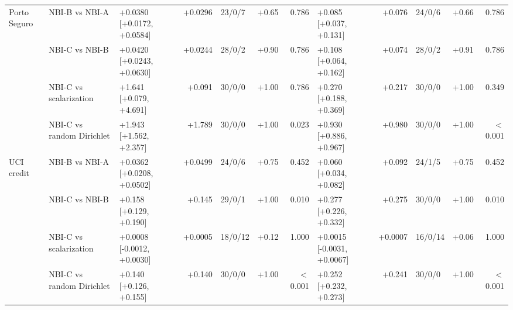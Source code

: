 \begin{table}[t]
{\begin{tabular}{ll lrlrr lrlrr}
\addlinespace
Porto Seguro & NBI-B vs NBI-A & +0.0380 [+0.0172, +0.0584] & +0.0296 & 23/0/7 & +0.65 & 0.786 & +0.085 [+0.037, +0.131] & +0.076 & 24/0/6 & +0.66 & 0.786 \\
 & NBI-C vs NBI-B & +0.0420 [+0.0243, +0.0630] & +0.0244 & 28/0/2 & +0.90 & 0.786 & +0.108 [+0.064, +0.162] & +0.074 & 28/0/2 & +0.91 & 0.786 \\
 & NBI-C vs scalarization & +1.641 [+0.079, +4.691] & +0.091 & 30/0/0 & +1.00 & 0.786 & +0.270 [+0.188, +0.369] & +0.217 & 30/0/0 & +1.00 & 0.349 \\
 & NBI-C vs random Dirichlet & +1.943 [+1.562, +2.357] & +1.789 & 30/0/0 & +1.00 & 0.023 & +0.930 [+0.886, +0.967] & +0.980 & 30/0/0 & +1.00 & $<$0.001 \\
\addlinespace
UCI credit & NBI-B vs NBI-A & +0.0362 [+0.0208, +0.0502] & +0.0499 & 24/0/6 & +0.75 & 0.452 & +0.060 [+0.034, +0.082] & +0.092 & 24/1/5 & +0.75 & 0.452 \\
 & NBI-C vs NBI-B & +0.158 [+0.129, +0.190] & +0.145 & 29/0/1 & +1.00 & 0.010 & +0.277 [+0.226, +0.332] & +0.275 & 30/0/0 & +1.00 & 0.010 \\
 & NBI-C vs scalarization & +0.0008 [-0.0012, +0.0030] & +0.0005 & 18/0/12 & +0.12 & 1.000 & +0.0015 [-0.0031, +0.0067] & +0.0007 & 16/0/14 & +0.06 & 1.000 \\
 & NBI-C vs random Dirichlet & +0.140 [+0.126, +0.155] & +0.140 & 30/0/0 & +1.00 & $<$0.001 & +0.252 [+0.232, +0.273] & +0.241 & 30/0/0 & +1.00 & $<$0.001 \\
\bottomrule
\end{tabular}}
\end{table}
